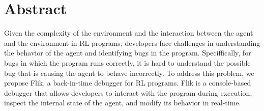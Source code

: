 
\chapter{Abstract}

Given the complexity of the environment and the interaction between the agent 
and the environment in \ac{RL} programs, developers face challenges in understanding 
the behavior of the agent and identifying bugs in the program. Speciffically, 
for bugs in which the program runs correctly, it is hard to understand the 
possible bug that is causing the agent to behave incorrectly. To address this 
problem, we propose \ac{Flik}, a back-in-time debugger for \ac{RL} programs.
\ac{Flik} is a console-based debugger that allows developers to interact with 
the program during execution, inspect the internal state of the agent, and modify 
its behavior in real-time. 


\endinput

